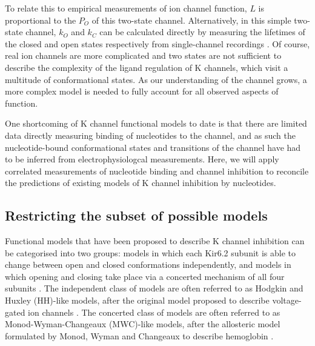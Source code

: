 To relate this to empirical measurements of ion channel function, $L$ is proportional to the $P_O$ of this two-state channel.
Alternatively, in this simple two-state channel, $k_O$ and $k_C$ can be calculated directly by measuring the lifetimes of the closed and open states respectively from single-channel recordings \cite{reinhold_penner_auth_single-channel_1995, sivilotti_praise_2016}.
Of course, real ion channels are more complicated and two states are not sufficient to describe the complexity of the ligand regulation of K\ATP{} channels, which visit a multitude of conformational states.
As our understanding of the channel grows, a more complex model is needed to fully account for all observed aspects of function.

One shortcoming of K\ATP{} channel functional models to date is that there are limited data directly measuring binding of nucleotides to the channel, and as such the nucleotide-bound conformational states and transitions of the channel have had to be inferred from electrophysiologcal measurements.
Here, we will apply correlated measurements of nucleotide binding and channel inhibition to reconcile the predictions of existing models of K\ATP{} channel inhibition by nucleotides.

\subsection{Restricting the subset of possible models}

Functional models that have been proposed to describe K\ATP{} channel inhibition can be categorised into two groups: models in which each Kir6.2 subunit is able to change between open and closed conformations independently, and models in which opening and closing take place via a concerted mechanism of all four subunits \cite{enkvetchakul_kinetic_2000-1, enkvetchakul_atp_2001, drain_concerted_2004, fang_n-terminal_2006, wang_subunit-stoichiometric_2007, craig_how_2008-1, proks_modeling_2009, vedovato_nucleotide-binding_2015}.
The independent class of models are often referred to as Hodgkin and Huxley (HH)-like models, after the original model proposed to describe voltage-gated ion channels \cite{hodgkin_quantitative_1952}.
The concerted class of models are often referred to as Monod-Wyman-Changeaux (MWC)-like models, after the allosteric model formulated by Monod, Wyman and Changeaux to describe hemoglobin \cite{monod_nature_1965}.


